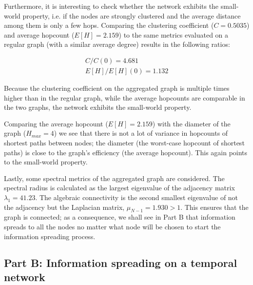 \documentclass[letterpaper]{article}
\begin{document}
Furthermore, it is interesting to check whether the network exhibits the small-world property, i.e. if the nodes are strongly clustered and the average distance among them is only a few hops. 
Comparing the clustering coefficient (\(C=0.5035\)) and average hopcount (\(E[H]=2.159\)) to the same metrics evaluated on a regular graph (with a similar average degree) results in the following ratios: 

\begin{align*}
C/C(0) = 4.681\\
E[H]/E[H](0) = 1.132
\end{align*}

\clearpage %
Because the clustering coefficient on the aggregated graph is multiple times higher than in the regular graph, while the average hopcounts are comparable in the two graphs, the network exhibits the small-world property. 

Comparing the average hopcount (\(E[H]=2.159\)) with the diameter of the graph (\(H_{max}=4\)) we see that there is not a lot of variance in hopcounts of shortest paths between nodes; the diameter (the worst-case hopcount of shortest paths) is close to the graph's efficiency (the average hopcount). This again points to the small-world property.

Lastly, some spectral metrics of the aggregated graph are considered. The spectral radius is calculated as the largest eigenvalue of the adjacency matrix \(\lambda_1=41.23\). The algebraic connectivity is the second smallest eigenvalue of not the adjacency but the Laplacian matrix, \(\mu_{N-1}=1.930 > 1\). This ensures that the graph is connected; as a consequence, we shall see in Part B that information spreads to all the nodes no matter what node will be chosen to start the information spreading process.


\subsection*{Part B: Information spreading on a temporal network}
\end{document}
